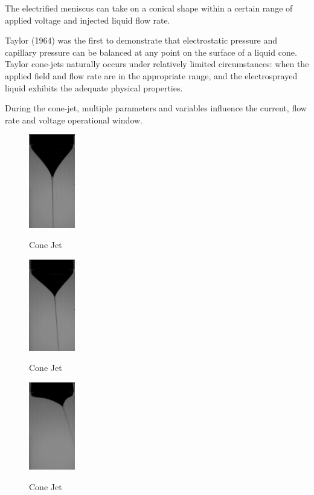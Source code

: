 The electrified meniscus can take on a conical shape within a certain range of applied voltage and injected liquid flow rate. 


Taylor (1964)\cite{taylor} was the first to demonstrate that electrostatic pressure and capillary pressure can be balanced at any point on the surface of a liquid cone.
Taylor cone-jets naturally occurs under relatively limited circumstances: when the applied field and flow rate are in the appropriate range, and the electrosprayed liquid exhibits the adequate physical properties.

During the cone-jet, multiple parameters and variables influence the current, flow rate and voltage operational window.

\begin{multicols}{3}

  \begin{figure}[H]
      \center
      \includegraphics[width=2cm]{Figuras/april/conjet1.png}
      \label{fig:conjt1}
      \caption{Cone Jet}
  \end{figure}


  \begin{figure}[H]
      \center
      \includegraphics[width=2cm]{Figuras/april/conjet2.png}
      \label{fig:conjt2}
      \caption{Cone Jet}
  \end{figure}


  \begin{figure}[H]
      \center
      \includegraphics[width=2cm]{Figuras/april/conjet3.png}
      \label{fig:conjt3}
      \caption{Cone Jet}
  \end{figure}

\end{multicols}

